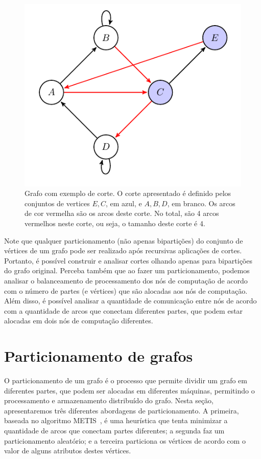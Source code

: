 \documentclass[conference]{IEEEtran}
\begin{document}
\begin{figure}
    \begin{center}
        \includegraphics[width=.5\textwidth]{fund_conc/cut_example.pdf}
    \end{center}
    \caption{Grafo com exemplo de corte. O corte apresentado é definido
    pelos conjuntos de vertices ${E, C}$, em azul, e $A, B, D$, em
    branco. Os arcos de cor vermelha são os arcos deste corte. No total,
    são 4 arcos vermelhos neste corte, ou seja, o tamanho deste corte
    é 4.}
    \label{fig:example_cut}
\end{figure}

Note que qualquer particionamento (não apenas bipartições) do conjunto
de vértices de um grafo pode ser realizado após recursivas aplicações de
cortes. Portanto, é possível construir e analisar cortes olhando apenas
para bipartições do grafo original. Perceba também que ao fazer um
particionamento, podemos analisar o balanceamento de processamento
dos nós de computação de acordo com o número de partes (e vértices)
que são alocadas aos nós de computação. Além disso, é possível analisar
a quantidade de comunicação entre nós de acordo com a quantidade de
arcos que conectam diferentes partes, que podem estar alocadas em dois
nós de computação diferentes.


\section{Particionamento de grafos}
O particionamento de um grafo é o processo que permite dividir um grafo
em diferentes partes, que podem ser alocadas em diferentes máquinas,
permitindo o processamento e armazenamento distribuído do grafo. Nesta
seção, apresentaremos três diferentes abordagens de particionamento.
A primeira, baseada no algoritmo METIS~\cite{metis}, é uma heurística
que tenta minimizar a quantidade de arcos que conectam partes
diferentes; a segunda faz um particionamento aleatório; e a terceira
particiona os vértices de acordo com o valor de alguns atributos destes
vértices.
\end{document}
